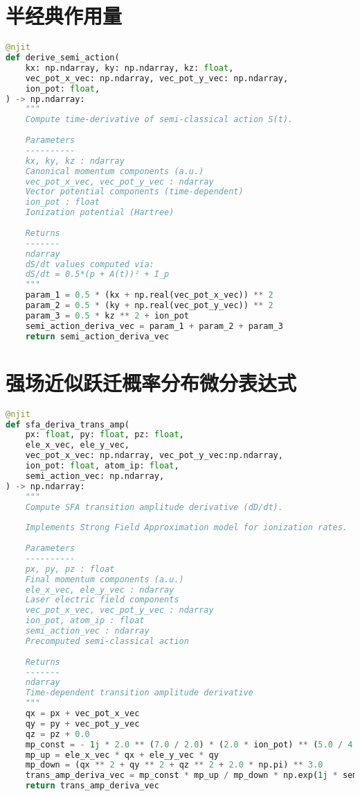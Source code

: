 \section{半经典作用量}\label{app:semi_action}
\begin{lstlisting}[language=Python, caption={半经典作用量}, label={code:semi-action}]
@njit
def derive_semi_action(
	kx: np.ndarray, ky: np.ndarray, kz: float,
	vec_pot_x_vec: np.ndarray, vec_pot_y_vec: np.ndarray,
	ion_pot: float,
) -> np.ndarray:
    """
	Compute time-derivative of semi-classical action S(t).
	
	Parameters
	----------
	kx, ky, kz : ndarray
	Canonical momentum components (a.u.)
	vec_pot_x_vec, vec_pot_y_vec : ndarray
	Vector potential components (time-dependent)
	ion_pot : float
	Ionization potential (Hartree)
	
	Returns
	-------
	ndarray
	dS/dt values computed via:
	dS/dt = 0.5*(p + A(t))² + I_p
	"""
	param_1 = 0.5 * (kx + np.real(vec_pot_x_vec)) ** 2
	param_2 = 0.5 * (ky + np.real(vec_pot_y_vec)) ** 2
	param_3 = 0.5 * kz ** 2 + ion_pot
	semi_action_deriva_vec = param_1 + param_2 + param_3
	return semi_action_deriva_vec
\end{lstlisting}

\section{强场近似跃迁概率分布微分表达式}\label{app:sfa_trans_amp}
\begin{lstlisting}[language=Python, caption={SFA跃迁概率分布微分表达式}, label={code:sfa-trans-amp}]
@njit
def sfa_deriva_trans_amp(
	px: float, py: float, pz: float,
	ele_x_vec, ele_y_vec,
	vec_pot_x_vec: np.ndarray, vec_pot_y_vec:np.ndarray,
	ion_pot: float, atom_ip: float,
	semi_action_vec: np.ndarray,
) -> np.ndarray:
    """
	Compute SFA transition amplitude derivative (dD/dt).
	
	Implements Strong Field Approximation model for ionization rates.
	
	Parameters
	----------
	px, py, pz : float
	Final momentum components (a.u.)
	ele_x_vec, ele_y_vec : ndarray
	Laser electric field components
	vec_pot_x_vec, vec_pot_y_vec : ndarray
	ion_pot, atom_ip : float
	semi_action_vec : ndarray
	Precomputed semi-classical action
	
	Returns
	-------
	ndarray
	Time-dependent transition amplitude derivative
	"""
	qx = px + vec_pot_x_vec
	qy = py + vec_pot_y_vec
	qz = pz + 0.0
	mp_const = - 1j * 2.0 ** (7.0 / 2.0) * (2.0 * ion_pot) ** (5.0 / 4.0) / np.pi
	mp_up = ele_x_vec * qx + ele_y_vec * qy
	mp_down = (qx ** 2 + qy ** 2 + qz ** 2 + 2.0 * np.pi) ** 3.0
	trans_amp_deriva_vec = mp_const * mp_up / mp_down * np.exp(1j * semi_action_vec)
	return trans_amp_deriva_vec
\end{lstlisting}

